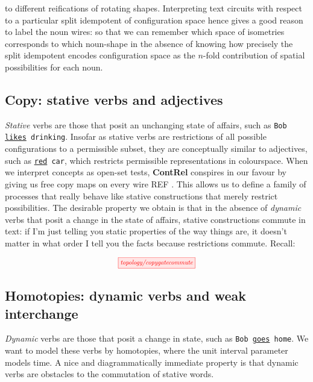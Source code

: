 to different reifications of rotating shapes. Interpreting text circuits with respect to a particular split idempotent of configuration space hence gives a good reason to label the noun wires: so that we can remember which space of isometries corresponds to which noun-shape in the absence of knowing how precisely the split idempotent encodes configuration space as the $n$-fold contribution of spatial possibilities for each noun.

\begin{example}

\end{example}

\subsection{Copy: stative verbs and adjectives}

\emph{Stative} verbs are those that posit an unchanging state of affairs, such as \texttt{Bob \underline{likes} drinking}. Insofar as stative verbs are restrictions of all possible configurations to a permissible subset, they are conceptually similar to adjectives, such as \texttt{\underline{red} car}, which restricts permissible representations in colourspace. When we interpret concepts as open-set tests, \textbf{ContRel} conspires in our favour by giving us free copy maps on every wire \bR REF \e. This allows us to define a family of processes that really behave like stative constructions that merely restrict possibilities. The desirable property we obtain is that in the absence of \emph{dynamic} verbs that posit a change in the state of affairs, stative constructions commute in text: if I'm just telling you static properties of the way things are, it doesn't matter in what order I tell you the facts because restrictions commute. Recall:

\[\scalebox{0.75}{\tikzfig{topology/copygatecommute}}\]

\begin{example}

\end{example}

\subsection{Homotopies: dynamic verbs and weak interchange}

\emph{Dynamic} verbs are those that posit a change in state, such as \texttt{Bob \underline{goes} home}. We want to model these verbs by homotopies, where the unit interval parameter models time. A nice and diagrammatically immediate property is that dynamic verbs are obstacles to the commutation of stative words.

